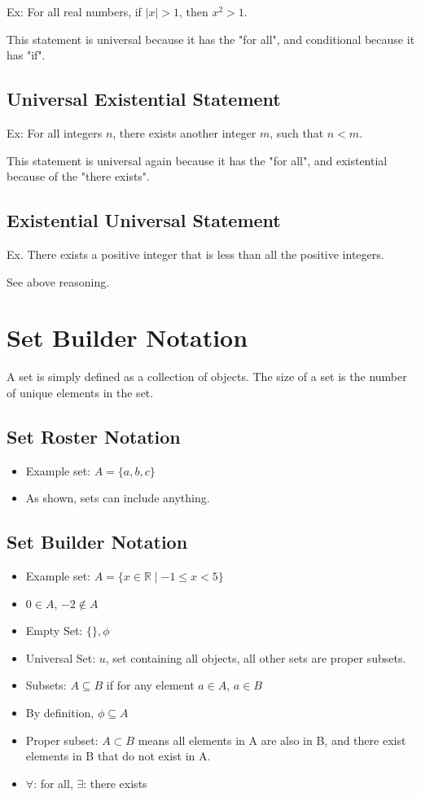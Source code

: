 \documentclass[a4paper]{report}
\begin{document}
Ex: For all real numbers, if $|x| > 1$, then  $x^2 > 1$.

This statement is universal because it has the "for all", and conditional because it has "if".

\subsection{Universal Existential Statement}

Ex: For all integers $n$, there exists another integer $m$, such that $n < m$.

This statement is universal again because it has the "for all", and existential because of the "there exists".

\subsection{Existential Universal Statement}

Ex. There exists a positive integer that is less than all the positive integers.

See above reasoning.

\section{Set Builder Notation}

A set is simply defined as a collection of objects. The size of a set is the number of unique elements in the set.

\subsection{Set Roster Notation}

\begin{itemize}
    \item Example set: $A = \{a, b, c\}$
    \item As shown, sets can include anything.
\end{itemize}

\subsection{Set Builder Notation}

\begin{itemize}
    \item Example set: $A = \{ x \in \mathbb{R} \mid -1 \le  x < 5 \}$
    \item $0 \in A$, $-2 \not\in A$
    \item Empty Set: $\{\}, \phi$
    \item Universal Set: $u$, set containing all objects, all other sets are proper subsets.
    \item Subsets:  $A \subseteq B$ if for any element $a \in A$, $a \in B$
    \item By definition, $\phi \subseteq A$
    \item Proper subset: $A \subset B$ means all elements in A are also in B, and there exist elements in B that do not exist in A.
    \item $\forall $: for all, $\exists $: there exists
\end{itemize}
\end{document}
